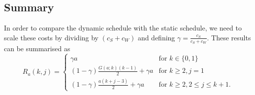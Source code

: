 \subsection{Summary}
In order to compare the dynamic schedule with the static schedule, we need to scale these costs by dividing by $(c_{S} + c_{W})$ and defining $\gamma = \frac{c_{S}}{c_{S} + c_{W}}$. These results can be summarised as
\begin{equation}
	R_{a} (k, j) = \begin{cases}
		\gamma a & \text{for $k \in \{ 0, 1 \}$} \\
		(1 - \gamma) \frac{G (a; k) (k - 1)}{2} + \gamma a & \text{for $k \geq 2, j = 1$} \\
		(1 - \gamma) \frac{a (k + j - 3)}{2} + \gamma a & \text{for $k \geq 2, 2 \leq j \leq k + 1$}.
	\end{cases}
\end{equation}

















































